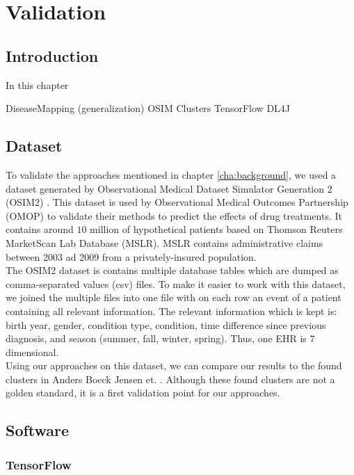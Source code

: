 \graphicspath{ {Implementation/Images/} }


\chapter{Validation}
\label{cha:implementation}

\section{Introduction}
In this chapter 

DiseaseMapping (generalization)
OSIM
Clusters
TensorFlow
DL4J

\section{Dataset}

To validate the approaches mentioned in chapter \ref{cha:background}, we used a dataset generated by Observational Medical Dataset Simulator Generation 2 (OSIM2) \cite{OSIM:online}. This dataset is used by Observational Medical Outcomes Partnership (OMOP) to validate their methods to predict the effects of drug treatments. It contains around $10$ million of hypothetical patients based on Thomson Reuters MarketScan Lab Database (MSLR). MSLR contains administrative claims between 2003 ad 2009 from a privately-insured population. \\

The OSIM2 dataset is contains multiple database tables which are dumped as comma-separated values (csv) files. To make it easier to work with this dataset, we joined the multiple files into one file with on each row an event of a patient containing all relevant information. The relevant information which is kept is: birth year, gender, condition type, condition, time difference since previous diagnosis, and season (summer, fall, winter, spring). Thus, one EHR is $7$ dimensional. \\	

Using our approaches on this dataset, we can compare our results to the found clusters in Anders Boeck Jensen et. \cite{Brunak:article}. Although these found clusters are not a golden standard, it is a first validation point for our approaches.


\section{Software}

\subsection{TensorFlow}

